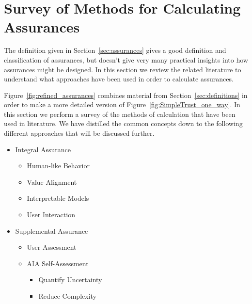 \section{Survey of Methods for Calculating Assurances} \label{sec:synthesis}
    The definition given in Section~\ref{sec:assurances} gives a good definition and classification of assurances, but doesn't give very many practical insights into how assurances might be designed. In this section we review the related literature to understand what approaches have been used in order to calculate assurances.
    
    Figure~\ref{fig:refined_assurances} combines material from Section~\ref{sec:definitions} in order to make a more detailed version of Figure~\ref{fig:SimpleTrust_one_way}. In this section we perform a survey of the methods of calculation that have been used in literature. We have distilled the common concepts down to the following different approaches that will be discussed further.

    \begin{itemize}
        \item Integral Assurance
        \begin{itemize}
            \item Human-like Behavior
            \item Value Alignment
            \item Interpretable Models
            \item User Interaction
        \end{itemize}
        \item Supplemental Assurance
        \begin{itemize}
            \item User Assessment
            \item AIA Self-Assessment
            \begin{itemize}
                \item Quantify Uncertainty
                \item Reduce Complexity
            \end{itemize}
        \end{itemize}
    \end{itemize}

